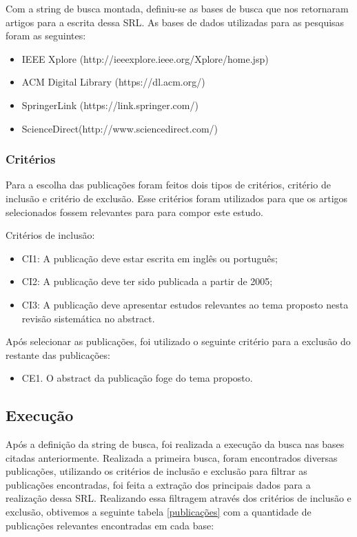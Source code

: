 \documentclass[12pt]{article}
\begin{document}
Com a string de busca montada, definiu-se as bases de busca que nos retornaram artigos para a escrita dessa SRL. As bases de 
dados utilizadas para as pesquisas foram as seguintes:

\begin{itemize}
  \item IEEE Xplore (http://ieeexplore.ieee.org/Xplore/home.jsp)
  \item ACM Digital Library (https://dl.acm.org/)
  \item SpringerLink (https://link.springer.com/)
  \item ScienceDirect(http://www.sciencedirect.com/)
\end{itemize}

\subsubsection{Critérios}

Para a escolha das publicações foram feitos dois tipos de critérios, critério de inclusão e critério de exclusão.
Esse critérios foram utilizados para que os artigos selecionados fossem relevantes para para compor este estudo.

Critérios de inclusão:

\begin{itemize}
  \item CI1: A publicação deve estar escrita em inglês ou português;
  \item CI2: A publicação deve ter sido publicada a partir de 2005;
  \item CI3: A publicação deve apresentar estudos relevantes ao tema proposto nesta revisão sistemática no abstract.
\end{itemize}

Após selecionar as publicações, foi utilizado o seguinte critério para a exclusão do restante das publicações:

\begin{itemize}
  \item CE1. O abstract da publicação foge do tema proposto.
\end{itemize}

\subsection{Execução}

Após a definição da string de busca, foi realizada a execução da busca nas bases citadas anteriormente. Realizada a primeira
busca, foram encontrados diversas publicações, utilizando os critérios de inclusão e exclusão para filtrar as publicações
encontradas, foi feita a extração dos principais dados para a realização dessa SRL. Realizando essa filtragem através dos
critérios de inclusão e exclusão, obtivemos a seguinte tabela \ref{publicações} com a quantidade de publicações relevantes
encontradas em cada base:
\end{document}
